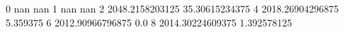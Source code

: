 0 nan nan
1 nan nan
2 2048.2158203125 35.30615234375
4 2018.26904296875 5.359375
6 2012.90966796875 0.0
8 2014.30224609375 1.392578125
